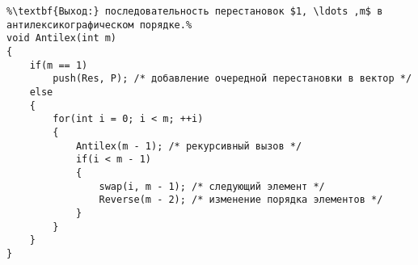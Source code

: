 \documentclass{article}
\begin{document}
\begin{lstlisting}[escapechar=\%]
%\noindent\textbf{Вход:} m - параметр процедуры - количество первых элементов массива P, для которых генерируются перестановки.%
%\textbf{Выход:} последовательность перестановок $1, \ldots ,m$ в антилексикографическом порядке.%
void Antilex(int m)
{
	if(m == 1)
		push(Res, P); /* добавление очередной перестановки в вектор */
	else
	{
		for(int i = 0; i < m; ++i)
		{
			Antilex(m - 1); /* рекурсивный вызов */
			if(i < m - 1)
			{
				swap(i, m - 1); /* следующий элемент */
				Reverse(m - 2); /* изменение порядка элементов */
			}
		}
	}
}
\end{lstlisting}
\end{document}
